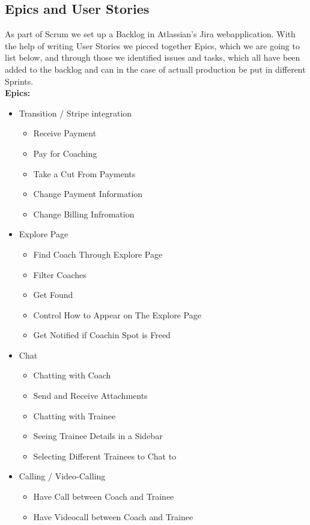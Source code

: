\subsection{Epics and User Stories}
As part of Scrum we set up a Backlog in Atlassian's Jira webapplication. With the help of writing User Stories we pieced together Epics, which we are going to list below, and through those we identified issues and tasks, which all have been added to the backlog and can in the case of actuall production be put in different Sprints. \\
\textbf{Epics:}
\begin{itemize}

    \item Transition / Stripe integration
    \begin{itemize}
        \item Receive Payment
        \item Pay for Coaching
        \item Take a Cut From Payments
        \item Change Payment Information
        \item Change Billing Infromation
    \end{itemize}

    \item Explore Page
    \begin{itemize}
        \item Find Coach Through Explore Page
        \item Filter Coaches
        \item Get Found
        \item Control How to Appear on The Explore Page
        \item Get Notified if Coachin Spot is Freed
    \end{itemize}

    \item Chat
    \begin{itemize}
        \item Chatting with Coach
        \item Send and Receive Attachments
        \item Chatting with Trainee
        \item Seeing Trainee Details in a Sidebar
        \item Selecting Different Trainees to Chat to
    \end{itemize}

    \item Calling / Video-Calling
    \begin{itemize}
        \item Have Call between Coach and Trainee
        \item Have Videocall between Coach and Trainee
    \end{itemize}


\end{itemize}
